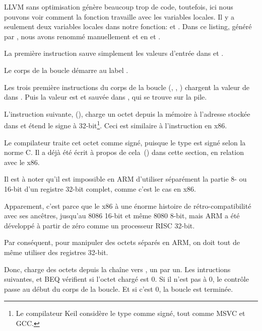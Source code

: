 ﻿

\mysubparagraph{\NonOptimizingXcodeIV (\ARMMode)}



LLVM sans optimisation génère beaucoup trop de code, toutefois, ici nous pouvons
voir comment la fonction travaille avec les variables locales.
Il y a seulement deux variables locales dans notre fonction:  et .
Dans ce listing, généré par \IDA, nous avons renommé manuellement  et
 en  et .

La première instruction sauve simplement les valeurs d'entrée dans  et .

Le corps de la boucle démarre au label .

Les trois première instructions du corps de la boucle (, \ADD, )
chargent la valeur de  dans .
Puis la valeur est  et sauvée dans , qui
se trouve sur la pile.

L'instruction suivante,  (), charge
un octet depuis la mémoire à l'adresse stockée dans  et étend le signe à
32-bit\footnote{Le compilateur Keil considère le type \Tchar comme signé, tout
comme MSVC et GCC.}.
Ceci est similaire à l'instruction \MOVSX en x86.

Le compilateur traite cet octet comme signé, puisque le type \Tchar est signé selon
la norme C.
Il a déjà été écrit à propos de cela~() dans cette section, en relation
avec le x86.


Il est à noter qu'il est impossible en ARM d'utiliser séparément la partie 8- ou
16-bit d'un registre 32-bit complet, comme c'est le cas en x86.

Apparement, c'est parce que le x86 à une énorme histoire de rétro-compatibilité
avec ses ancêtres, jusqu'au 8086 16-bit et même 8080 8-bit, mais ARM a été développé
à partir de zéro comme un processeur RISC 32-bit.

Par conséquent, pour manipuler des octets séparés en ARM, on doit tout de même utiliser
des registres 32-bit.

Donc,  charge des octets depuis la chaîne vers , un par un.
Les intructions suivantes, \CMP et \ac{BEQ} vérifient si l'octet chargé est 0.
Si il n'est pas à 0, le contrôle passe au début du corps de la boucle.
Et si c'est 0, la boucle est terminée.

